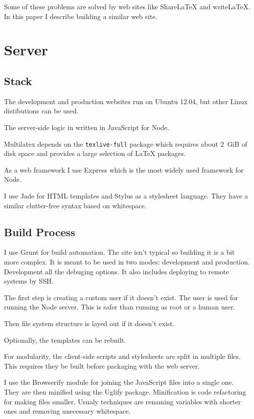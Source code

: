 \documentclass{llncs}
\begin{document}
Some of these problems are solved by web sites like \mbox{ShareLaTeX} and \mbox{writeLaTeX}. In this paper I describe building a similar web site.

\section{Server}

\subsection{Stack}

The development and production websites run on Ubuntu 12.04, but other Linux distibutions can be used.

The server-side logic in written in JavaScript for Node.

Multilatex depends on the \texttt{texlive-full} package which requires about 2~GiB of disk space and provides a large selection of \LaTeX{} packages.

As a web framework I use Express which is the most widely used framework for Node.

I use Jade for HTML templates and Stylus as a stylesheet language. They have a similar clutter-free syntax based on whitespace.

\subsection {Build Process}

I use Grunt for build automation. The site isn't typical so building it is a bit more complex. It is meant to be used in two modes: development and production. Development all the debuging options. It also includes deploying to remote systems by SSH.

The first step is creating a custom user if it doesn't exist. The user is used for running the Node server. This is safer than running as root or a human user.

Then file system structure is layed out if it doesn't exist.

Optionally, the templates can be rebuilt.

For modularity, the client-side scripts and stylesheets are split in multiple files. This requires they be built before packaging with the web server.

I use the Browserify module for joining the JavaScript files into a single one. They are then minified using the Uglify package. Minification is code refactoring for making files smaller. Usualy techniques are renaming variables with shorter ones and removing unecessary whitespace.
\end{document}

